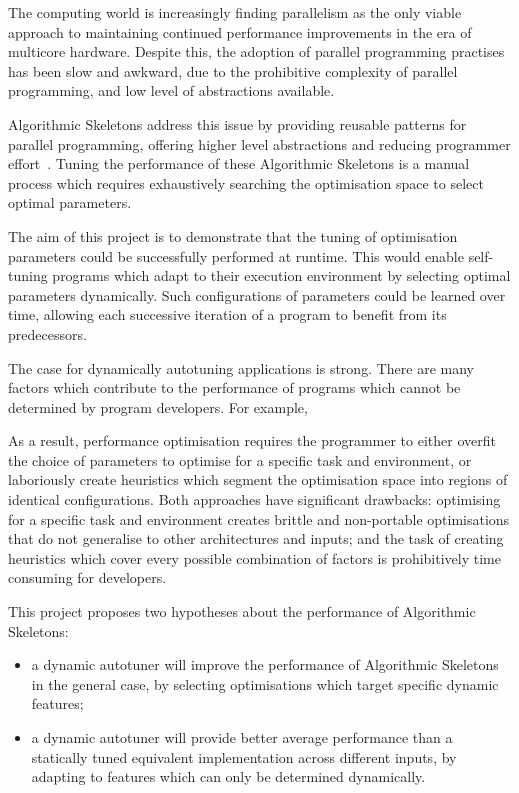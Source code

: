 The computing world is increasingly finding parallelism as the only
viable approach to maintaining continued performance improvements in
the era of multicore hardware. Despite this, the adoption of parallel
programming practises has been slow and awkward, due to the
prohibitive complexity of parallel programming, and low level of
abstractions available.

Algorithmic Skeletons address this issue by providing reusable
patterns for parallel programming, offering higher level abstractions
and reducing programmer effort~\cite{Cole1989, Cole2004}. Tuning the
performance of these Algorithmic Skeletons is a manual process which
requires exhaustively searching the optimisation space to select
optimal parameters.

The aim of this project is to demonstrate that the tuning of
optimisation parameters could be successfully performed at
runtime. This would enable self-tuning programs which adapt to their
execution environment by selecting optimal parameters
dynamically. Such configurations of parameters could be learned over
time, allowing each successive iteration of a program to benefit from
its predecessors.

The case for dynamically autotuning applications is strong. There are
many factors which contribute to the performance of programs which
cannot be determined by program developers. For example,


As a result, performance optimisation requires the programmer to
either overfit the choice of parameters to optimise for a specific
task and environment, or laboriously create heuristics which segment
the optimisation space into regions of identical configurations. Both
approaches have significant drawbacks: optimising for a specific task
and environment creates brittle and non-portable optimisations that do
not generalise to other architectures and inputs; and the task of
creating heuristics which cover every possible combination of factors
is prohibitively time consuming for developers.

This project proposes two hypotheses about the performance of
Algorithmic Skeletons:
\begin{itemize}
\item a dynamic autotuner will improve the performance of Algorithmic
  Skeletons in the general case, by selecting optimisations which
  target specific dynamic features;
\item a dynamic autotuner will provide better average performance than
  a statically tuned equivalent implementation across different
  inputs, by adapting to features which can only be determined
  dynamically.
\end{itemize}

